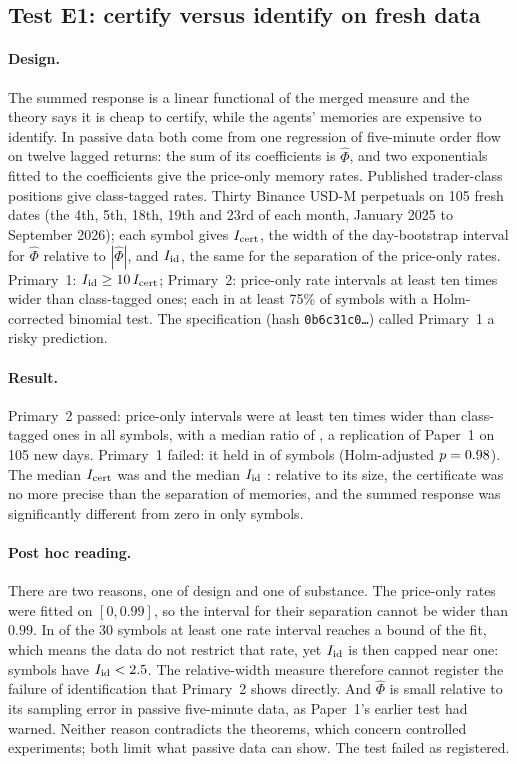 \subsection{Test E1: certify versus identify on fresh data}\label{sec:ev_e1}

\paragraph{Design.} The summed response is a linear functional of the merged measure and the theory says it is cheap to certify, while the agents' memories are expensive to identify. In passive data both come from one regression of five-minute order flow on twelve lagged returns: the sum of its coefficients is $\hat\Phi$, and two exponentials fitted to the coefficients give the price-only memory rates. Published trader-class positions give class-tagged rates. Thirty Binance USD-M perpetuals on 105 fresh dates (the 4th, 5th, 18th, 19th and 23rd of each month, January 2025 to September 2026); each symbol gives $I_{\rm cert}$, the width of the day-bootstrap interval for $\hat\Phi$ relative to $|\hat\Phi|$, and $I_{\rm id}$, the same for the separation of the price-only rates. Primary~1: $I_{\rm id}\ge10\,I_{\rm cert}$; Primary~2: price-only rate intervals at least ten times wider than class-tagged ones; each in at least 75\% of symbols with a Holm-corrected binomial test. The specification (hash \texttt{0b6c31c0\ldots}) called Primary~1 a risky prediction.

\paragraph{Result.} Primary~2 passed: price-only intervals were at least ten times wider than class-tagged ones in all \EonePtwo{} symbols, with a median ratio of \EoneMedianRatio{}, a replication of Paper~1 on 105 new days. Primary~1 failed: it held in \EonePone{} of \EoneSymbols{} symbols (Holm-adjusted $p=0.98$). The median $I_{\rm cert}$ was \EoneMedianIcert{} and the median $I_{\rm id}$ \EoneMedianIid{}: relative to its size, the certificate was no more precise than the separation of memories, and the summed response was significantly different from zero in only \EonePhiIdentified{} symbols.

\paragraph{Post hoc reading.} There are two reasons, one of design and one of substance. The price-only rates were fitted on $[0,0.99]$, so the interval for their separation cannot be wider than $0.99$. In \EoneSaturated{} of the 30 symbols at least one rate interval reaches a bound of the fit, which means the data do not restrict that rate, yet $I_{\rm id}$ is then capped near one: \EoneSmallIid{} symbols have $I_{\rm id}<2.5$. The relative-width measure therefore cannot register the failure of identification that Primary~2 shows directly. And $\hat\Phi$ is small relative to its sampling error in passive five-minute data, as Paper~1's earlier test had warned. Neither reason contradicts the theorems, which concern controlled experiments; both limit what passive data can show. The test failed as registered.

